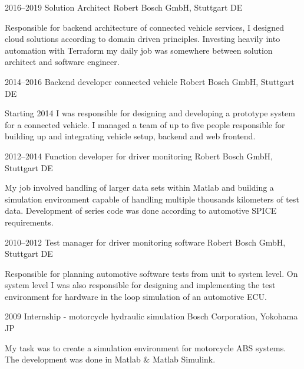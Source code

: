 \documentclass[]{friggeri-cv} %
\begin{document}
\begin{entrylist}
\entry
{2016--2019}
{Solution Architect}
{Robert Bosch GmbH, Stuttgart DE}
{Responsible for backend architecture of connected vehicle services, I designed cloud solutions according to domain driven principles. Investing heavily into automation with Terraform my daily job was somewhere between solution architect and software engineer.

}
\end{entrylist}
\begin{entrylist}
\entry
{2014--2016}
{Backend developer connected vehicle}
{Robert Bosch GmbH, Stuttgart DE}
{Starting 2014 I was responsible for designing and developing a prototype system for a connected vehicle. I managed a team of up to five people responsible for building up and integrating vehicle setup, backend and web frontend.

}
\end{entrylist}
\begin{entrylist}
\entry
{2012--2014}
{Function developer for driver monitoring}
{Robert Bosch GmbH, Stuttgart DE}
{My job involved handling of larger data sets within Matlab and building a simulation environment capable of handling multiple thousands kilometers of test data. Development of series code was done according to automotive SPICE requirements.

}
\end{entrylist}
\begin{entrylist}
\entry
{2010--2012}
{Test manager for driver monitoring software}
{Robert Bosch GmbH, Stuttgart DE}
{Responsible for planning automotive software tests from unit to system level. On system level I was also responsible for designing and implementing the test environment for hardware in the loop simulation of an automotive ECU.

}
\end{entrylist}
\begin{entrylist}
\entry
{2009}
{Internship - motorcycle hydraulic simulation}
{Bosch Corporation, Yokohama JP}
{My task was to create a simulation environment for motorcycle ABS systems. The development was done in Matlab \& Matlab Simulink.

}
\end{entrylist}
\end{document}
